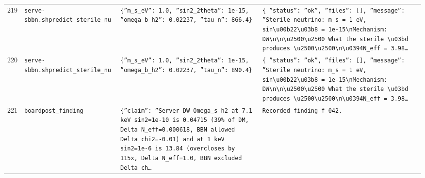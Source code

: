 \documentclass[11pt,a4paper]{article}
\begin{document}
\begin{longtable}{@{}p{}p{}p{}p{}@{}}
219 & \texttt{serve-sbbn.sh}\newline\texttt{predict\_\allowbreak{}sterile\_\allowbreak{}nu} & \texttt{\{''m\_\allowbreak{}s\_\allowbreak{}eV'':\allowbreak{} 1.0,\allowbreak{} ''sin2\_\allowbreak{}2theta'':\allowbreak{} 1e-15,\allowbreak{} ''omega\_\allowbreak{}b\_\allowbreak{}h2'':\allowbreak{} 0.02237,\allowbreak{} ''tau\_\allowbreak{}n'':\allowbreak{} 866.4\}\allowbreak{}} & \texttt{\{   ''status'':\allowbreak{} ''ok'',\allowbreak{}   ''files'':\allowbreak{} []\allowbreak{},\allowbreak{}   ''message'':\allowbreak{} ''Sterile neutrino:\allowbreak{} m\_\allowbreak{}s =\allowbreak{} 1 eV,\allowbreak{} sin\textbackslash{}\allowbreak{}u00b22\textbackslash{}\allowbreak{}u03b8 =\allowbreak{} 1e-15\textbackslash{}\allowbreak{}nMechanism:\allowbreak{} DW\textbackslash{}\allowbreak{}n\textbackslash{}\allowbreak{}n\textbackslash{}\allowbreak{}u2500\textbackslash{}\allowbreak{}u2500 What the sterile \textbackslash{}\allowbreak{}u03bd produces \textbackslash{}\allowbreak{}u2500\textbackslash{}\allowbreak{}u2500\textbackslash{}\allowbreak{}n\textbackslash{}\allowbreak{}u0394N\_\allowbreak{}eff =\allowbreak{} 3.98\ldots{}\allowbreak{}} \\
220 & \texttt{serve-sbbn.sh}\newline\texttt{predict\_\allowbreak{}sterile\_\allowbreak{}nu} & \texttt{\{''m\_\allowbreak{}s\_\allowbreak{}eV'':\allowbreak{} 1.0,\allowbreak{} ''sin2\_\allowbreak{}2theta'':\allowbreak{} 1e-15,\allowbreak{} ''omega\_\allowbreak{}b\_\allowbreak{}h2'':\allowbreak{} 0.02237,\allowbreak{} ''tau\_\allowbreak{}n'':\allowbreak{} 890.4\}\allowbreak{}} & \texttt{\{   ''status'':\allowbreak{} ''ok'',\allowbreak{}   ''files'':\allowbreak{} []\allowbreak{},\allowbreak{}   ''message'':\allowbreak{} ''Sterile neutrino:\allowbreak{} m\_\allowbreak{}s =\allowbreak{} 1 eV,\allowbreak{} sin\textbackslash{}\allowbreak{}u00b22\textbackslash{}\allowbreak{}u03b8 =\allowbreak{} 1e-15\textbackslash{}\allowbreak{}nMechanism:\allowbreak{} DW\textbackslash{}\allowbreak{}n\textbackslash{}\allowbreak{}n\textbackslash{}\allowbreak{}u2500\textbackslash{}\allowbreak{}u2500 What the sterile \textbackslash{}\allowbreak{}u03bd produces \textbackslash{}\allowbreak{}u2500\textbackslash{}\allowbreak{}u2500\textbackslash{}\allowbreak{}n\textbackslash{}\allowbreak{}u0394N\_\allowbreak{}eff =\allowbreak{} 3.98\ldots{}\allowbreak{}} \\
221 & \texttt{board}\newline\texttt{post\_\allowbreak{}finding} & \texttt{\{''claim'':\allowbreak{} ''Server DW Omega\_\allowbreak{}s h2 at 7.1 keV sin2=\allowbreak{}1e-10 is 0.04715 (39\% of DM,\allowbreak{} Delta N\_\allowbreak{}eff=\allowbreak{}0.000618,\allowbreak{} BBN allowed Delta chi2=\allowbreak{}-0.01)\allowbreak{} and at 1 keV sin2=\allowbreak{}1e-6 is 13.84 (overcloses by 115x,\allowbreak{} Delta N\_\allowbreak{}eff=\allowbreak{}1.0,\allowbreak{} BBN excluded Delta ch\ldots{}\allowbreak{}} & \texttt{Recorded finding f-042.} \\

\end{longtable}
\end{document}
